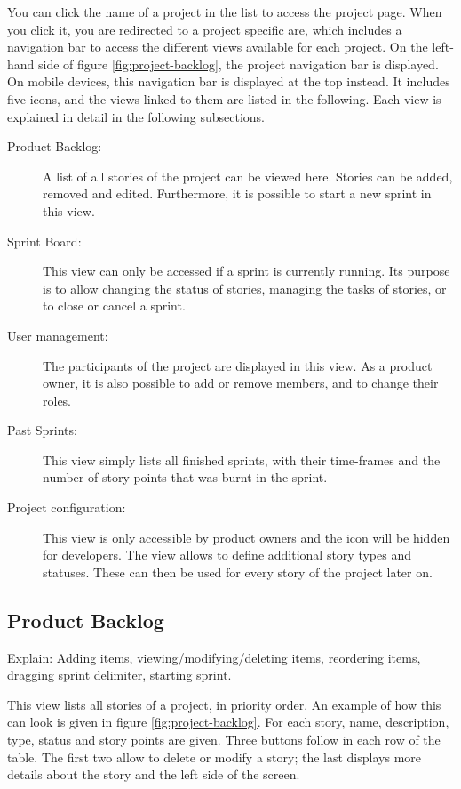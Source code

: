 \documentclass[
	accentcolor=tud1a %
]{tudreport}
\begin{document}
You can click the name of a project in the list to access the project page. When you click it, you are redirected to a project specific are, which includes a navigation bar to access the different views available for each project. On the left-hand side of figure \ref{fig:project-backlog}, the project navigation bar is displayed. On mobile devices, this navigation bar is displayed at the top instead. It includes five icons, and the views linked to them are listed in the following. Each view is explained in detail in the following subsections.
\begin{description}
	\item[Product Backlog:] A list of all stories of the project can be viewed here. Stories can be added, removed and edited. Furthermore, it is possible to start a new sprint in this view.
	\item[Sprint Board:] This view can only be accessed if a sprint is currently running. Its purpose is to allow changing the status of stories, managing the tasks of stories, or to close or cancel a sprint.
	\item[User management:] The participants of the project are displayed in this view. As a product owner, it is also possible to add or remove members, and to change their roles.
	\item[Past Sprints:] This view simply lists all finished sprints, with their time-frames and the number of story points that was burnt in the sprint.
	\item[Project configuration:] This view is only accessible by product owners and the icon will be hidden for developers. The view allows to define additional story types and statuses. These can then be used for every story of the project later on.
\end{description}


\subsection{Product Backlog}
\label{sec:backlog}

Explain: Adding items, viewing/modifying/deleting items, reordering items, dragging sprint delimiter, starting sprint.

This view lists all stories of a project, in priority order. An example of how this can look is given in figure \ref{fig:project-backlog}. For each story, name, description, type, status and story points are given. Three buttons follow in each row of the table. The first two allow to delete or modify a story; the last displays more details about the story and the left side of the screen.
\end{document}
